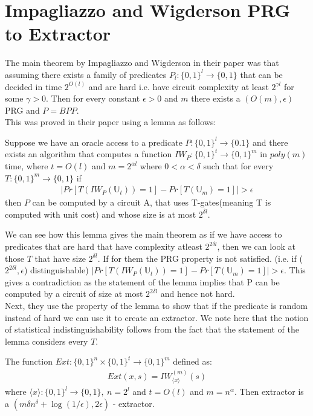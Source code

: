 \section{Impagliazzo and Wigderson PRG to Extractor}
The main theorem by Impagliazzo and Wigderson in their paper \cite{Impagliazzo:1997:PBE:258533.258590} was that assuming there exists a family of predicates $P_l : \{0,1\}^l \rightarrow \{0,1\}$ that can be decided in time $2^{O(l)}$ and are hard i.e. have circuit complexity at least $2^{\gamma l}$ for some $\gamma > 0$. Then for every constant $\epsilon > 0$ and $m$ there exists a $(O(m),\epsilon)$ PRG and $P=BPP$.
\\
This was proved in their paper using a lemma as follows:
\begin{lemma}
	\label{IWPRG}
	Suppose we have an oracle access to a predicate $P: \{0,1\}^l \rightarrow \{0.1\}$ and there exists an algorithm that computes a function $IW_P : \{0,1\}^t \rightarrow \{0,1\}^m$ in $poly(m)$ time, where $t=O(l)$ and $m=2^{\alpha l}$ where $0 < \alpha < \delta$ such that for every $T : \{0,1\}^m \rightarrow \{0,1\}$ if
	\begin{align*}
		|Pr[T(IW_P(\mathbb{U}_t)) = 1] - Pr[T(\mathbb{U}_m) = 1]| > \epsilon
	\end{align*} 
	then $P$ can be computed by a circuit A, that uses T-gates(meaning T is computed with unit cost) and whose size is at most $2^{\delta l}$.
\end{lemma}
We can see how this lemma gives the main theorem as if we have access to predicates that are hard that have complexity atleast $2^{2\delta l}$, then we can look at those $T$ that have size $2^{\delta l}$. If for them the PRG property is not satisfied. (i.e. if ($2^{2\delta l},\epsilon$) distinguishable) $|Pr[T(IW_P(\mathbb{U}_t)) = 1] - Pr[T(\mathbb{U}_m) = 1]| > \epsilon$. This gives a contradiction as the statement of the lemma implies that P can be computed by a circuit of size at most $2^{2\delta l}$ and hence not hard.
\\
Next, they use the property of the lemma to show that if the predicate is random instead of hard we can use it to create an extractor. We note here that the notion of statistical indistinguishability follows from the fact that the statement of the lemma considers every $T$. 
\begin{lemma}
	The function $Ext : \{0,1\}^n \times \{0,1\}^t \rightarrow \{0,1\}^m$ defined as:
	\begin{align*}
		Ext(x,s) = IW_{\langle x \rangle}^{(m)}(s)
	\end{align*}
	where $\langle x \rangle : \{0,1\}^l \rightarrow \{0,1\},~n=2^l$ and $t=O(l)$ and $m=n^\alpha$. Then extractor is a $(m\delta n^\delta + \log (1/\epsilon),2\epsilon)$ - extractor. 
\end{lemma}
